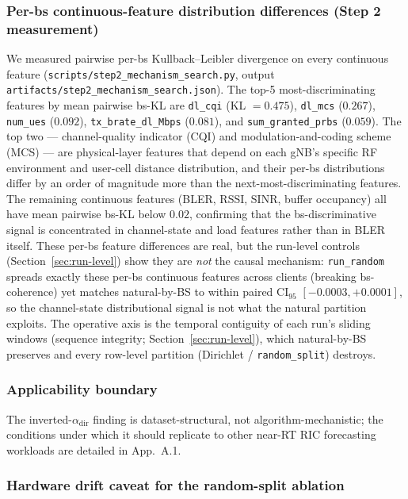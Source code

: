 \documentclass[journal]{IEEEtran}
\newcommand{\alphadir}{\ensuremath{\alpha_{\mathrm{dir}}}}
\begin{document}
\subsubsection{Per-bs continuous-feature distribution differences (Step 2 measurement)}\label{sec:kl}

We measured pairwise per-bs Kullback--Leibler divergence on every continuous feature (\lstinline|scripts/step2_mechanism_search.py|, output \lstinline|artifacts/step2_mechanism_search.json|). The top-5 most-discriminating features by mean pairwise bs-KL are \lstinline|dl_cqi| (KL $= 0.475$), \lstinline|dl_mcs| ($0.267$), \lstinline|num_ues| ($0.092$), \lstinline|tx_brate_dl_Mbps| ($0.081$), and \lstinline|sum_granted_prbs| ($0.059$). The top two --- channel-quality indicator (CQI) and modulation-and-coding scheme (MCS) --- are physical-layer features that depend on each gNB's specific RF environment and user-cell distance distribution, and their per-bs distributions differ by an order of magnitude more than the next-most-discriminating features. The remaining continuous features (BLER, RSSI, SINR, buffer occupancy) all have mean pairwise bs-KL below $0.02$, confirming that the bs-discriminative signal is concentrated in channel-state and load features rather than in BLER itself. These per-bs feature differences are real, but the run-level controls (Section~\ref{sec:run-level}) show they are \emph{not} the causal mechanism: \lstinline|run_random| spreads exactly these per-bs continuous features across clients (breaking bs-coherence) yet matches natural-by-BS to within paired CI$_{95}$ $[-0.0003, +0.0001]$, so the channel-state distributional signal is not what the natural partition exploits. The operative axis is the temporal contiguity of each run's sliding windows (sequence integrity; Section~\ref{sec:run-level}), which natural-by-BS preserves and every row-level partition (Dirichlet / \lstinline|random_split|) destroys.

\subsubsection{Applicability boundary}

The inverted-$\alphadir$ finding is dataset-structural, not algorithm-mechanistic; the conditions under which it should replicate to other near-RT RIC forecasting workloads are detailed in App.~A.1.

\subsubsection{Hardware drift caveat for the random-split ablation}\label{sec:hardware-drift}
\end{document}
